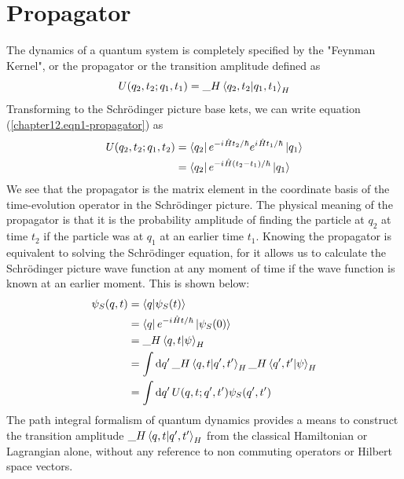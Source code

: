 	\section{Propagator}
	The dynamics of a quantum system is completely specified by the "Feynman Kernel", or the propagator or the transition amplitude defined as
	\begin{equation}
		U(q_2, t_2; q_1, t_1) = {\_H}\braket{q_2, t_2}{q_1, t_1}_H
		\label{chapter12.eqn1-propagator}
	\end{equation}
	Transforming to the Schr\"{o}dinger picture base kets, we can write equation (\ref{chapter12.eqn1-propagator}) as
	\begin{align}
		U(q_2, t_2; q_1, t_2) 
		&= \bra{q_2}e^{-{i\mkern1mu} \hat{H}t_2/\hbar} e^{{i\mkern1mu} \hat{H}t_1/\hbar} \ket{q_1} \nonumber \\
		&= \bra{q_2}e^{-{i\mkern1mu} \hat{H}(t_2-t_1)/\hbar} \ket{q_1} \label{chapter12.eqn2-propagator}
	\end{align}
	We see that the propagator is the matrix element in the coordinate basis of the time-evolution operator in the Schr\"{o}dinger picture. The physical meaning of the propagator is that it is the probability amplitude of finding the particle at $q_2$ at time $t_2$ if the particle was at $q_1$ at an earlier time $t_1$. Knowing the propagator is equivalent to solving the Schr\"{o}dinger equation, for it allows us to calculate the Schr\"{o}dinger picture wave function at any moment of time if the wave function is known at an earlier moment. This is shown below:
	\begin{align}
		\psi_S(q,t )
		&= \braket{q}{\psi_S(t)} \\
		&= \bra{q}e^{-{i\mkern1mu} \hat{H}t/\hbar} \ket{\psi_S(0)} \\
		&= {\_H}\braket{q,t}{\psi}_H \\
		&= \int \dd{q^\prime} {\_H}\braket{q,t}{q^\prime, t^\prime}_H {\_H}\braket{q^\prime, t^\prime}{\psi}_H \\
		&= \int \dd{q^\prime} U(q,t;q^\prime, t^\prime) \psi_S(q^\prime,t^\prime)
	\end{align}
	The path integral formalism of quantum dynamics provides a means to construct the transition amplitude ${\_H}\braket{q,t}{q^\prime, t^\prime}_H$ from the classical Hamiltonian or Lagrangian alone, without any reference to non commuting operators or Hilbert space vectors.\\
	

